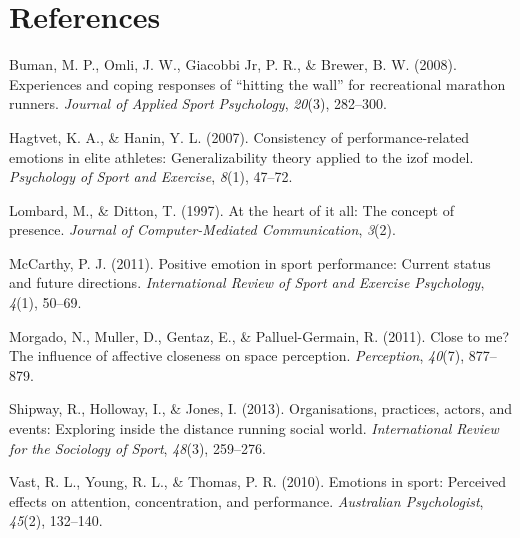 \documentclass[,man]{apa6}
\theoremstyle{definition}
\theoremstyle{definition}
\theoremstyle{definition}
\theoremstyle{remark}
\begin{document}
\section{References}\label{references}

\begingroup
\setlength{\parindent}{-0.5in} \setlength{\leftskip}{0.5in}

\hypertarget{refs}{}
\hypertarget{ref-buman2008experiences}{}
Buman, M. P., Omli, J. W., Giacobbi Jr, P. R., \& Brewer, B. W. (2008).
Experiences and coping responses of ``hitting the wall'' for
recreational marathon runners. \emph{Journal of Applied Sport
Psychology}, \emph{20}(3), 282--300.

\hypertarget{ref-hagtvet2007consistency}{}
Hagtvet, K. A., \& Hanin, Y. L. (2007). Consistency of
performance-related emotions in elite athletes: Generalizability theory
applied to the izof model. \emph{Psychology of Sport and Exercise},
\emph{8}(1), 47--72.

\hypertarget{ref-lombard1997heart}{}
Lombard, M., \& Ditton, T. (1997). At the heart of it all: The concept
of presence. \emph{Journal of Computer-Mediated Communication},
\emph{3}(2).

\hypertarget{ref-mccarthy2011positive}{}
McCarthy, P. J. (2011). Positive emotion in sport performance: Current
status and future directions. \emph{International Review of Sport and
Exercise Psychology}, \emph{4}(1), 50--69.

\hypertarget{ref-morgado2011close}{}
Morgado, N., Muller, D., Gentaz, E., \& Palluel-Germain, R. (2011).
Close to me? The influence of affective closeness on space perception.
\emph{Perception}, \emph{40}(7), 877--879.

\hypertarget{ref-shipway2013organisations}{}
Shipway, R., Holloway, I., \& Jones, I. (2013). Organisations,
practices, actors, and events: Exploring inside the distance running
social world. \emph{International Review for the Sociology of Sport},
\emph{48}(3), 259--276.

\hypertarget{ref-vast2010emotions}{}
Vast, R. L., Young, R. L., \& Thomas, P. R. (2010). Emotions in sport:
Perceived effects on attention, concentration, and performance.
\emph{Australian Psychologist}, \emph{45}(2), 132--140.

\endgroup
\end{document}
